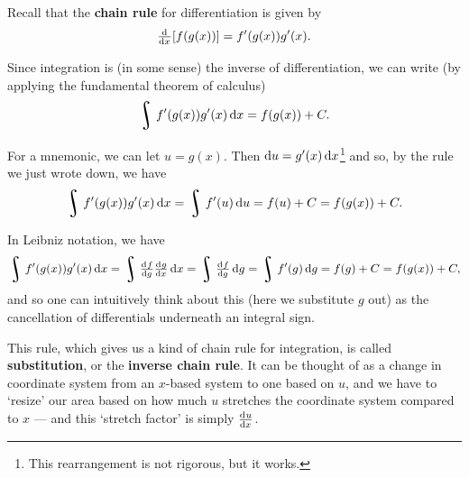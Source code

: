 


Recall that the \textbf{chain rule} for differentiation is given by
\begin{displaymath}
  \od{}{x} [f(g(x))] = f'(g(x)) g'(x).
\end{displaymath}

Since integration is (in some sense) the inverse of differentiation, we can write (by applying the fundamental theorem of calculus)
\begin{displaymath}
  \rint f'(g(x)) g'(x) \dif{x} = f(g(x)) + C.
\end{displaymath}

For a mnemonic, we can let $ u = g(x) $. Then $ \dif{u} = g'(x) \dif{x} $\footnote{This rearrangement is not rigorous, but it works.}
and so, by the rule we just wrote down, we have
\begin{displaymath}
  \rint f'(g(x)) g'(x) \dif{x} = \rint f'(u) \dif{u} = f(u) + C = f(g(x)) + C.
\end{displaymath}

In Leibniz notation, we have
\begin{displaymath}
  \rint f'(g(x)) g'(x) \dif{x} = \rint \od{f}{g} \od{g}{x} \dif{x} = \rint \od{f}{g} \dif{g} = \rint f'(g) \dif{g} = f(g) + C = f(g(x)) + C,
\end{displaymath}
and so one can intuitively think about this (here we substitute $ g $ out) as the cancellation of differentials underneath an integral sign.

This rule, which gives us a kind of chain rule for integration, is called \textbf{substitution}, or the \textbf{inverse chain rule}. It
can be thought of as a change in coordinate system from an $ x$-based system to one based on $ u $, and we have to `resize' our area based
on how much $ u $ stretches the coordinate system compared to $ x $ --- and this `stretch factor' is simply $ \od{u}{x} $.

